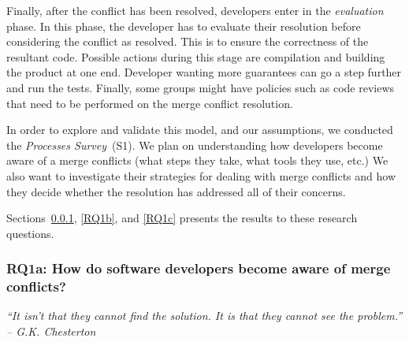 Finally, after the conflict has been resolved, developers enter in the \emph{evaluation} phase.
In this phase, the developer has to evaluate their resolution before considering the conflict as resolved.
This is to ensure the correctness of the resultant code.
Possible actions during this stage are compilation and building the product at one end.
Developer wanting more guarantees can go a step further and run the tests.
Finally, some groups might have policies such as code reviews that need to be performed on the merge conflict resolution.
 
In order to explore and validate this model, and our assumptions, we conducted the \emph{Processes Survey}~(S1).
We plan on understanding how developers become aware of a merge conflicts (what steps they take, what tools they use, etc.)
We also want to investigate their strategies for dealing with merge conflicts and how they decide whether the resolution has addressed all of their concerns.

Sections~\ref{RQ1a}, \ref{RQ1b}, and \ref{RQ1c} presents the results to these research questions.

\subsubsection{\textbf{RQ1a:} How do software developers become \textbf{aware} of merge conflicts?}\label{RQ1a}
\vspace*{-0.5\baselineskip}
\begin{quoting}
\textit{``It isn't that they cannot find the solution. It is that they cannot see the problem.'' -- G.K. Chesterton}
\end{quoting}
\vspace*{+0.3\baselineskip}

